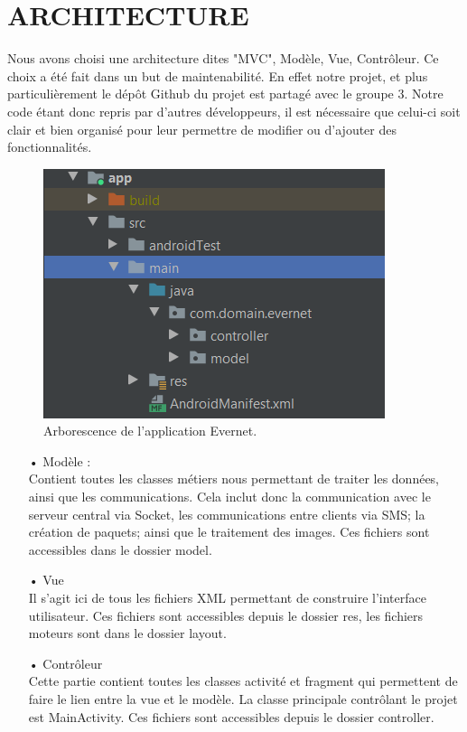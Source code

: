 \chapter{ ARCHITECTURE }

Nous avons choisi une architecture dites "MVC", Modèle, Vue, Contrôleur. 
Ce choix a été fait dans un but de maintenabilité. En effet notre projet, et plus particulièrement le dépôt Github du projet est partagé avec le groupe 3. Notre code étant donc repris par d'autres développeurs, il est nécessaire que celui-ci soit clair et bien organisé pour leur permettre de modifier ou d'ajouter des fonctionnalités.
\\
\begin{figure}[H]
    \includegraphics[width=10cm]{images/arbo.png}
    \caption{Arborescence de l'application Evernet.}
\end{figure}

\begin{itemize}
    \item [•] Modèle : \\
    Contient toutes les classes métiers nous permettant de traiter les données, ainsi que les communications.
    Cela inclut donc la communication avec le serveur central via Socket, les communications entre clients via SMS; la création de paquets; ainsi que le traitement des images. Ces fichiers sont accessibles dans le dossier model.
    \\
    
    \item [•] Vue \\
    Il s'agit ici de tous les fichiers XML permettant de construire l'interface utilisateur. Ces fichiers sont accessibles depuis le dossier res, les fichiers moteurs sont dans le dossier layout.
    \\
    
    \item [•] Contrôleur \\
    Cette partie contient toutes les classes activité et fragment qui permettent de faire le lien entre la vue et le modèle. La classe principale contrôlant le projet est MainActivity.
    Ces fichiers sont accessibles depuis le dossier controller.
    
\end{itemize}

